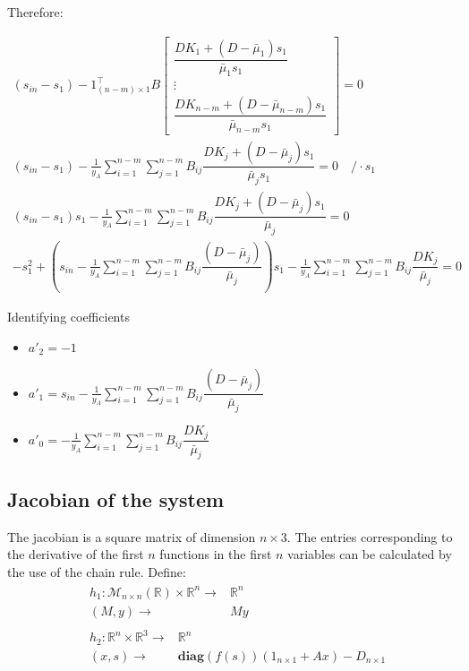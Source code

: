 \documentclass[3p,times]{article}
\newcommand{\R}{\mathbb{R}}
\newcommand{\diag}{\textbf{diag}}
\begin{document}
Therefore:

\begin{align}
(s_{in}-s_1)- 1_{(n-m)\times 1}^\top 
B\begin{bmatrix}
\dfrac{DK_1+(D-\bar{\mu}_1)s_1}{\bar{\mu}_{1}s_1} \\ \vdots \\ \dfrac{DK_{n-m}+(D-\bar{\mu}_{n-m})s_1}{\bar{\mu}_{n-m}s_1}
\end{bmatrix} = 0 \\
(s_{in}-s_1) -\frac{1}{y_A} \sum \limits_{i=1}^{n-m}\sum \limits_{j=1}^{n-m} B_{ij}\dfrac{DK_j+(D-\bar{\mu}_j)s_1}{\bar{\mu}_{j}s_1}  = 0 \quad /\cdot s_1 \\
(s_{in} - s_1)s_1   -\frac{1}{y_A} \sum \limits_{i=1}^{n-m}\sum \limits_{j=1}^{n-m} B_{ij}\dfrac{DK_j+(D-\bar{\mu}_j)s_1}{\bar{\mu}_{j}}  = 0 \\
-s_1^2 + \left( s_{in}-\frac{1}{y_A} \sum \limits_{i=1}^{n-m}\sum \limits_{j=1}^{n-m} B_{ij}\dfrac{(D-\bar{\mu}_j)}{\bar{\mu}_{j}} \right)s_1 - \frac{1}{y_A} \sum \limits_{i=1}^{n-m}\sum \limits_{j=1}^{n-m} B_{ij}\dfrac{DK_j}{\bar{\mu}_{j}} =0
\end{align} 

Identifying coefficients
\begin{itemize}
	\item $a'_2 = -1$
	\item $a'_1 = s_{in}-\frac{1}{y_A} \sum \limits_{i=1}^{n-m}\sum \limits_{j = 1}^{n-m} B_{ij}\dfrac{(D-\bar{\mu}_j)}{\bar{\mu}_{j}}$
	\item $a'_0 =- \frac{1}{y_A} \sum \limits_{i=1}^{n-m}\sum \limits_{j = 1}^{n-m} B_{ij}\dfrac{DK_j}{\bar{\mu}_{j}}$ 
\end{itemize}


\subsection{Jacobian of the system}
The jacobian is a square matrix of dimension $n\times 3$. The entries corresponding to the derivative of the first $n$ functions in the first $n$ variables can be calculated by the use of the chain rule. Define:
\begin{align*} 
& \begin{array}{rc}
h_1:\mathcal{M}_{n \times n}(\R) \times \R^n \rightarrow & \R^n \\
(M,y) \rightarrow & My
\end{array}  \\
&\begin{array}{rl}
h_2: \R^n \times \R^3  \rightarrow & \R^n \\
(x,s) \rightarrow & \diag(f(s))\left(1_{n\times 1}+ Ax\right)-D_{n\times 1}
\end{array} 	
\end{align*}
\end{document}
